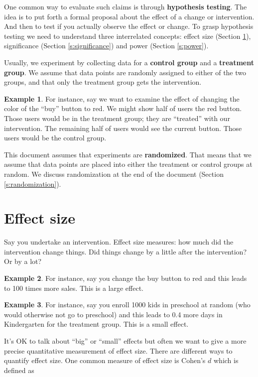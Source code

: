 \documentclass[]{article}
\theoremstyle{definition}
\newtheorem{exmp}{Example}[section]
\begin{document}
One common way to evaluate such claims is through \textbf{hypothesis testing}. The idea is to put forth a formal proposal about the effect of a change or intervention. And then to test if you actually observe the effect or change. To grasp hypothesis testing we need to understand three interrelated concepts: effect size (Section \ref{s:effect_size}), significance (Section \ref{s:significance}) and power (Section \ref{s:power}). 

Usually, we experiment by collecting data for a \textbf{control group} and a \textbf{treatment group}. We assume that data points are randomly assigned to either of the two groups, and that only the treatment group gets the intervention. 

\begin{exmp}
For instance, say we want to examine the effect of changing the color of the ``buy'' button to red. We might  show half of users the red button. Those users would be in the treatment group; they are ``treated'' with our intervention. The remaining half of users would see the current button. Those users would be the control group. 
\end{exmp}

This document assumes that experiments are \textbf{randomized}. That means that we assume that data points are placed into either the treatment or control groups at random. We discuss randomization at the end of the document (Section \ref{s:randomization}).

\section{Effect size}\label{s:effect_size}

Say you undertake an intervention. Effect size measures: how much did the intervention change things. Did things change by a little after the intervention? Or by a lot?

\begin{exmp}
For instance, say you change the buy button to red and this leads to 100 times more sales. This is a large effect.  
\end{exmp}

\begin{exmp}
For instance, say you enroll 1000 kids in preschool at random (who would otherwise not go to preschool) and this leads to 0.4 more days in Kindergarten for the treatment group. This is a small effect. 
\end{exmp}

It's OK to talk about ``big'' or ``small'' effects but often we want to give a more precise quantitative measurement of effect size. There are different ways to quantify effect size. One common measure of effect size is Cohen's $d$ which is defined as
\end{document}
